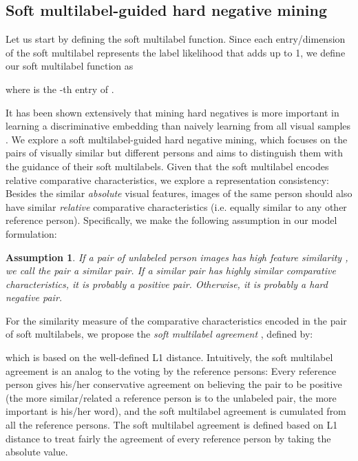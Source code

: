 \documentclass[10pt,twocolumn,letterpaper]{article}
\newcommand{\Koven}{\color{black}}
\newtheorem{assump}{Assumption}
\begin{document}
\subsection{Soft multilabel-guided hard negative mining}\label{sec:hard_negative}
{\Koven Let us start by defining the soft multilabel function.}
Since each entry/dimension of the soft multilabel  represents the label likelihood that adds up to 1,
we define our soft multilabel function as
{\small

}where  is the -th entry of .


It has been shown extensively that mining hard negatives
is more important in learning a discriminative embedding than naively learning from all
visual samples \cite{2017_Arxiv_triplet-loss,2016_NIPS_tuplet-loss,2016_CVPR_lifted-structured,2016_ECCV_moderate-mining,2015_CVPR_facenet}.
We explore a soft multilabel-guided hard negative mining,
which focuses on the pairs of visually similar but different persons and aims to distinguish them with the guidance of their soft multilabels.
Given that the soft multilabel encodes relative comparative characteristics,
we explore a representation consistency:
Besides the similar \emph{absolute} visual features,
images of the same person should also have similar \emph{relative} comparative characteristics
(i.e. equally similar to any other reference person).
Specifically, we make the following assumption in our model formulation:

\begin{assump}\label{assump}
If a pair of unlabeled person images  has high feature similarity ,
we call the pair a \emph{similar pair}.
If a similar pair has highly similar comparative characteristics, it is probably a positive pair.
Otherwise, it is probably a hard negative pair.
\end{assump}

For the similarity measure of the comparative characteristics encoded in the pair of soft multilabels,
we propose the \emph{soft multilabel agreement} ,
defined by:
{\footnotesize

}which is based on the well-defined L1 distance.
Intuitively, the soft multilabel agreement is an analog to the voting by the reference persons:
Every reference person  gives his/her conservative agreement
 on believing the pair to be positive
(the more similar/related a reference person is to the unlabeled pair, the more important is his/her word),
and the soft multilabel agreement is cumulated from all the reference persons.
{\Koven The soft multilabel agreement is defined based on L1 distance to treat fairly the agreement of every reference person by taking the absolute value.
}
\end{document}
